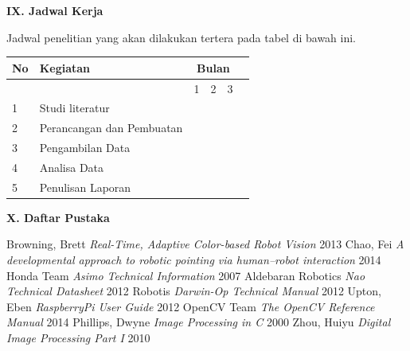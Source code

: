 \documentclass[a4paper,12pt]{article}
\begin{document}
\vspace{10pt}
\noindent \textbf{IX. \hspace{9pt} Jadwal Kerja}

Jadwal penelitian yang akan dilakukan tertera pada tabel di bawah ini.

\begin{center}
 \begin{tabular}{ |l|l|l|l|l|l| }
   \hline
   No & Kegiatan & \multicolumn{3}{|c|}{Bulan} \\
   \hline
     &  & 1 & 2 & 3 \\
   \hline
   1 & Studi literatur & \cellcolor{blue} & & \\
   \hline
   2 & Perancangan dan Pembuatan & \cellcolor{blue} & & \\
   \hline
   3 & Pengambilan Data & & \cellcolor{blue} & \\
   \hline
   4 & Analisa Data & & & \cellcolor{blue} \\
   \hline
   5 & Penulisan Laporan & & \cellcolor{blue} & \cellcolor{blue} \\
  \hline
\end{tabular}
\end{center}

\vspace{10pt}
\noindent \textbf{X. \hspace{9pt} Daftar Pustaka} 

\begingroup
  \renewcommand{\section}[2]{}%
    \begin{thebibliography}{}
	 Browning, Brett \textit{Real-Time, Adaptive Color-based Robot Vision} 2013
	 Chao, Fei \textit{A developmental approach to robotic pointing via human–robot interaction} 2014
	 Honda Team \textit{Asimo Technical Information} 2007
	 Aldebaran Robotics \textit{Nao Technical Datasheet} 2012
	 Robotis \textit{Darwin-Op Technical Manual} 2012
	 Upton, Eben \textit{RaspberryPi User Guide} 2012
	 OpenCV Team \textit{The OpenCV Reference Manual} 2014
	 Phillips, Dwyne \textit{Image Processing in C} 2000
	 Zhou, Huiyu \textit{Digital Image Processing Part I} 2010
    \end{thebibliography}
\endgroup
\end{document}

